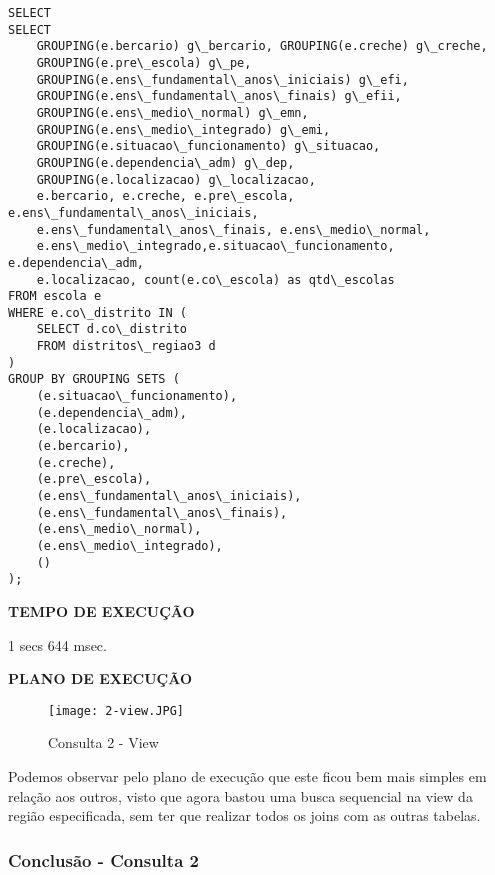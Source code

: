 \documentclass[12pt,a4paper]{article}
\begin{document}
\begin{Verbatim}[commandchars=\\\{\}]
SELECT
SELECT
    GROUPING(e.bercario) g\_bercario, GROUPING(e.creche) g\_creche, 
    GROUPING(e.pre\_escola) g\_pe,
    GROUPING(e.ens\_fundamental\_anos\_iniciais) g\_efi,
    GROUPING(e.ens\_fundamental\_anos\_finais) g\_efii, 
    GROUPING(e.ens\_medio\_normal) g\_emn,
    GROUPING(e.ens\_medio\_integrado) g\_emi, 
    GROUPING(e.situacao\_funcionamento) g\_situacao,
    GROUPING(e.dependencia\_adm) g\_dep, 
    GROUPING(e.localizacao) g\_localizacao,
    e.bercario, e.creche, e.pre\_escola, e.ens\_fundamental\_anos\_iniciais,
    e.ens\_fundamental\_anos\_finais, e.ens\_medio\_normal,
    e.ens\_medio\_integrado,e.situacao\_funcionamento, e.dependencia\_adm, 
    e.localizacao, count(e.co\_escola) as qtd\_escolas
FROM escola e
WHERE e.co\_distrito IN (
    SELECT d.co\_distrito
    FROM distritos\_regiao3 d
)
GROUP BY GROUPING SETS (
    (e.situacao\_funcionamento),
    (e.dependencia\_adm),
    (e.localizacao),
    (e.bercario),
    (e.creche),
    (e.pre\_escola),
    (e.ens\_fundamental\_anos\_iniciais),
    (e.ens\_fundamental\_anos\_finais),
    (e.ens\_medio\_normal),
    (e.ens\_medio\_integrado),
    ()
);
\end{Verbatim}

\begin{flushleft}
\textbf{TEMPO DE EXECUÇÃO}\\
\end{flushleft}
1 secs 644 msec.\\

\begin{flushleft}
\textbf{PLANO DE EXECUÇÃO}\\
\end{flushleft}

\begin{figure}[H]
    \centering
    \texttt{[image: 2-view.JPG]}
    \caption{Consulta 2 - View}
    \label{fig:diagrama}
\end{figure}

Podemos observar pelo plano de execução que este ficou bem mais simples em relação aos outros, visto que agora bastou uma busca sequencial na view da região especificada, sem ter que realizar todos os joins com as outras tabelas.

\subsubsection{Conclusão - Consulta 2}
\end{document}
